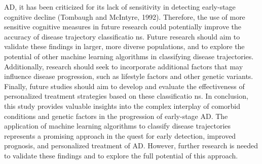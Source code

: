 \documentclass[conference]{IEEEtran}
\begin{document}
AD, it has been criticized for its lack of sensitivity in detecting early-stage cognitive decline (Tombaugh and McIntyre, 1992). Therefore, the use of more sensitive cognitive measures in future research could potentially improve the accuracy of disease trajectory classificatio ns. Future research should aim to validate these findings in larger, more diverse populations, and to explore the potential of other machine learning algorithms in classifying disease trajectories. Additionally, research should seek to incorporate additional factors that may influence disease progression, such as lifestyle factors and other genetic variants. Finally, future studies should aim to develop and evaluate the effectiveness of personalized treatment strategies based on these classificatio ns. In conclusion, this study provides valuable insights into the complex interplay of comorbid conditions and genetic factors in the progression of early-stage AD. The application of machine learning algorithms to classify disease trajectories represents a promising approach in the quest for early detection, improved prognosis, and personalized treatment of AD. However, further research is needed to validate these findings and to explore the full potential of this approach.
\end{document}
